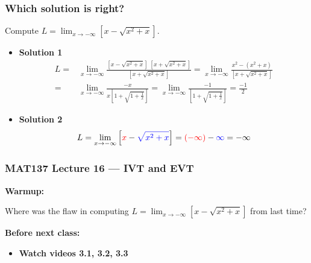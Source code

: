 \documentclass[14pt]{beamer}
\newcommand {\DS} [1] {${\displaystyle #1}$}
\newcommand{\setsize}[1]{\fontsize{#1}{#1}\selectfont} %
\begin{document}
\begin{frame}
\setsize{13}
\frametitle{Which solution is right?}
Compute \DS{L = \lim_{x \to -\infty} \left[  x - \sqrt{x^2+x} \right]}.

\begin{itemize}
	\item {\bf Solution 1}
{\setsize{11}
		\begin{align*}
			L = & \lim_{x\to -\infty} \frac{\left[  x - \sqrt{x^2+x} \right] \; \left[  x + \sqrt{x^2+x} \right]}{\left[  x + \sqrt{x^2+x} \right]}
			= \lim_{x \to -\infty} \frac{x^2-(x^2+x)}{\left[  x + \sqrt{x^2+x} \right]}
				\\
			=& \lim_{x \to -\infty}\frac{-x}{x \left[ 1 + \sqrt{1 + \frac{1}{x}} \right]} 
			= \lim_{x \to -\infty}\frac{-1}{ \left[ 1 + \sqrt{1 + \frac{1}{x}} \right]}
			= \frac{-1}{2}
		\end{align*}	
}
	\item  {\bf Solution 2}
		$$
			L = \lim_{x \to -\infty} \left[ {\color{red} x }- {\color{blue} \sqrt{x^2+x} }\right] = {\color{red}(-\infty)} - {\color{blue}\infty} = - \infty
		$$
\end{itemize}

\end{frame}

\begin{frame}
\frametitle{MAT137 Lecture 16 --- IVT and EVT}
	{\bf Warmup:}

	Where was the flaw in computing 
	\DS{L = \lim_{x \to -\infty} \left[  x - \sqrt{x^2+x} \right]}
	from last time?


	\vfill
	{\bf Before next class:}
		\begin{itemize} \normalsize
			\item {\bf Watch videos 3.1, 3.2, 3.3 }
		\end{itemize}

\end{frame}
\end{document}
